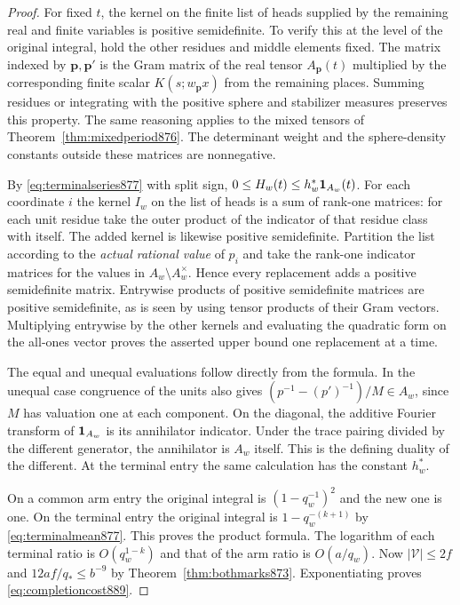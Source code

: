\documentclass[a4paper,11pt]{article}
\theoremstyle{definition}
\theoremstyle{remark}
\numberwithin{equation}{section}
\begin{document}
\begin{proof}
For fixed \(t\), the kernel on the finite list of heads supplied
by the remaining real and finite variables is positive
semidefinite. To verify this at the level of the original
integral, hold the other residues and middle elements fixed.
The matrix indexed by \(\mathbf p,\mathbf p'\) is the Gram
matrix of the real tensor \(A_{\mathbf p}(t)\) multiplied by
the corresponding finite scalar \(K(s;w_{\mathbf p}x)\) from
the remaining places. Summing residues or integrating with the
positive sphere and stabilizer measures preserves this property.
The same reasoning applies to the mixed tensors of
Theorem~\ref{thm:mixedperiod876}. The determinant weight and
the sphere-density constants outside these matrices are nonnegative.

By \eqref{eq:terminalseries877} with split sign, \(0\le H_w(t)
\le h_w^*{\bf1}_{A_w}(t)\). For each coordinate \(i\) the kernel
\(I_w\) on the list of heads is a sum of rank-one matrices: for
each unit residue take the outer product of the indicator of
that residue class with itself. The added kernel is likewise
positive semidefinite. Partition the list according to the
\emph{actual rational value} of \(p_i\) and take the rank-one
indicator matrices for the values in \(A_w\setminus A_w^\times\).
Hence every replacement adds a positive semidefinite matrix.
Entrywise products of positive semidefinite matrices are
positive semidefinite, as is seen by using tensor products of
their Gram vectors. Multiplying entrywise by the other kernels
and evaluating the quadratic form on the all-ones vector proves
the asserted upper bound one replacement at a time.

The equal and unequal evaluations follow directly from the formula.
In the unequal case congruence of the units also gives
\((p^{-1}-(p')^{-1})/M\in A_w\), since \(M\) has valuation one at
each component. On the diagonal, the additive Fourier transform
of \({\bf1}_{A_w}\) is its annihilator indicator. Under the
trace pairing divided by the different generator, the annihilator
is \(A_w\) itself. This is the defining duality of the different.
At the terminal entry the same calculation has the constant
\(h_w^*\).

On a common arm entry the original integral is
\((1-q_w^{-1})^2\) and the new one is one. On the terminal entry
the original integral is \(1-q_w^{-(k+1)}\) by
\eqref{eq:terminalmean877}. This proves the product formula.
The logarithm of each terminal ratio is \(O(q_w^{1-k})\) and
that of the arm ratio is \(O(a/q_w)\). Now
\(|\mathcal V|\le2f\) and \(12af/q_*\le b^{-9}\) by
Theorem~\ref{thm:bothmarks873}. Exponentiating proves
\eqref{eq:completioncost889}.
\end{proof}
\end{document}
